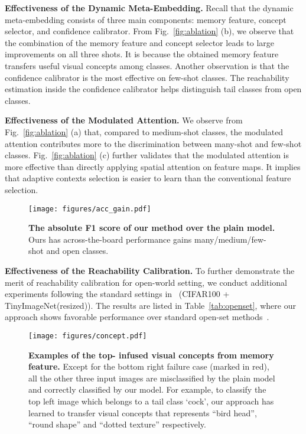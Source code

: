 \documentclass[10pt,twocolumn,letterpaper]{article}
\begin{document}
\vspace{2pt}
\noindent
\textbf{Effectiveness of the Dynamic Meta-Embedding.}
Recall that the dynamic meta-embedding consists of three main components: memory feature, concept selector, and confidence calibrator.
From Fig.~\ref{fig:ablation} (b), we observe that the combination of the memory feature and concept selector leads to large improvements on all three shots.
It is because the obtained memory feature transfers useful visual concepts among classes.
Another observation is that the confidence calibrator is the most effective on few-shot classes.
The reachability estimation inside the confidence calibrator helps distinguish tail classes from open classes.

\vspace{2pt}
\noindent
\textbf{Effectiveness of the Modulated Attention.}
We observe from Fig.~\ref{fig:ablation} (a) that, compared to medium-shot classes, the modulated attention contributes more to the discrimination between many-shot and few-shot classes. Fig.~\ref{fig:ablation} (c) further validates that the modulated attention is more effective than directly applying spatial attention on feature maps.
It implies that adaptive contexts selection is easier to learn than the conventional feature selection.



\begin{figure}[t]
  \centering
  \texttt{[image: figures/acc\_gain.pdf]}
  \caption{\textbf{The absolute F1 score of our method over the plain model.} Ours has across-the-board performance gains \wrt many/medium/few-shot and open classes.}
  \label{fig:acc_gain}
\end{figure}



\vspace{2pt}
\noindent
\textbf{Effectiveness of the Reachability Calibration.}
To further demonstrate the merit of reachability calibration for open-world setting, we conduct additional experiments following the standard settings in~\cite{hendrycks2016baseline, liang2017enhancing} (CIFAR100 + TinyImageNet(resized)). The results are listed in Table~\ref{tab:openset}, where our approach shows favorable performance over standard open-set methods~\cite{hendrycks2016baseline, liang2017enhancing}. 



\begin{figure*}[t]
  \centering
  \texttt{[image: figures/concept.pdf]}
  \caption{\textbf{Examples of the top- infused visual concepts from memory feature.} Except for the bottom right failure case 
(marked in red), all the other three input images are misclassified by the plain model and correctly classified by our model. For example, to classify the top left image which belongs to a tail class `cock', our approach has learned to transfer visual concepts that represents ``bird head'', ``round shape'' and ``dotted texture'' respectively. }
  \label{fig:neuron}
\end{figure*}
\end{document}
